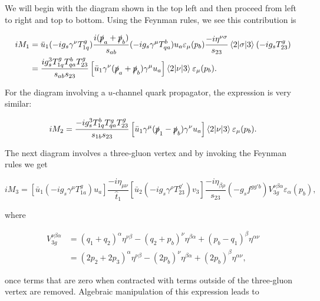We will begin with the diagram shown in the top left and then proceed from left to right and top to bottom. Using the Feynman rules, we see this contribution is

\begin{equation}
\begin{split}
iM_1 &= \bar{u}_1(-ig_s\gamma^\nu T^g_{1q})\frac{i(\slashed{p}_a+\slashed{p}_b)}{s_{ab}}(-ig_s \gamma^\mu T_{qa}^b)u_a \varepsilon_\mu(p_b) \frac{-i \eta^{\nu \sigma}}{s_{23}} \mathinner{\langle2\vert\sigma\vert3\rangle}_{} (- i g_s T^g_{23}) \\
&= \frac{i g_s^3 T^g_{1q}T^b_{qa}T^g_{23}}{s_{ab}s_{23}} \left[ \bar{u}_1 \gamma^\nu (\slashed{p}_a + \slashed{p}_b) \gamma^\mu u_a \right] \mathinner{\langle2\vert\nu\vert3\rangle}_{} \varepsilon_\mu (p_b).
\end{split}
\end{equation}

For the diagram involving a $u$-channel quark propagator, the expression is very similar:

\begin{equation}
iM_2 = \frac{-i g_s^3 T^b_{1q}T^g_{qa}T^g_{23}}{s_{1b}s_{23}} \left[ \bar{u}_1 \gamma^\mu (\slashed{p}_1 - \slashed{p}_b) \gamma^\nu u_a \right] \mathinner{\langle2\vert\nu\vert3\rangle}_{} \varepsilon_\mu (p_b).
\end{equation}

The next diagram involves a three-gluon vertex and by invoking the Feynman rules we get

\begin{equation}
iM_3 = \left[\bar{u}_1(-i g_s \gamma^\mu T^g_{1a}) u_a \right] \frac{-i \eta_{\mu \nu}}{\hat{t}_1} \left[\bar{u}_2 (-i g_s \gamma^\rho T^{g'}_{23}) v_3 \right] \frac{- i \eta_{\beta \rho}}{s_{23}} (-g_s f^{g g' b})V_{3g}^{\nu  \beta \alpha} \varepsilon_\alpha(p_b),
\end{equation}

where

\begin{equation}
\begin{split}
V_{3g}^{\nu \beta \alpha} &= (q_1+q_2)^\alpha \eta^{\nu \beta} - (q_2+p_b)^\nu \eta^{\beta \alpha} + (p_b-q_1)^\beta \eta^{ \alpha \nu} \\
&= (2p_2 + 2p_3)^\alpha \eta^{\nu \beta} - (2p_b)^\nu \eta^{\beta \alpha} + (2p_b)^\beta \eta^{ \alpha \nu},
\end{split}
\end{equation}

once terms that are zero when contracted with terms outside of the three-gluon vertex are removed. Algebraic manipulation of this expression leads to

